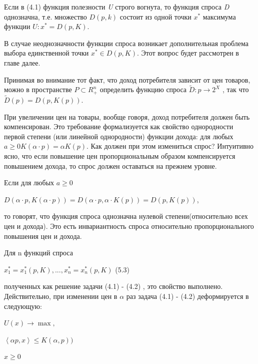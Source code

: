 \documentclass[12pt, 4paper]{book}
\begin{document}
{Если в (4.1) функция полезности \textit{U} строго вогнута, то функция спроса \textit{D} однозначна, т.е. множество $D(p,k)$ состоит из одной точки $x^{*}$ максимума функции $U:x^{*} = D(p,K)$. 
\par

В случае неоднозначности функции спроса возникает дополнительная проблема выбора единственной точки $x^{*} \in D(p,K)$. Этот вопрос будет рассмотрен в главе далее. 
\par

Принимая во внимание тот факт, что доход потребителя зависит от цен товаров, можно в пространстве $P\subset R_{+}^{n} $ определить функцию спроса $\widetilde{D}:p \rightarrow 2^{X}$ , так что $\widetilde{D}(p) = D(p,K(p)) $.
\par

При увеличении цен на товары, вообще говоря, доход потребителя должен быть компенсирован. Это требование формализуется как свойство однородности первой степени (или линейной однородности) функции дохода: для любых $a \geq 0 K(\alpha \cdot p) = \alpha K(p)$. Как должен при этом измениться спрос? Интуитивно ясно, что если повышение цен пропорциональным образом компенсируется повышением дохода, то спрос должен оставаться на прежнем уровне. 
\par

Если для любых $a \geq 0$
\begin{center}
$D(\alpha \cdot p, K(\alpha \cdot p)) = D (\alpha \cdot p, \alpha \cdot K(p)) = D(p,K(p))$,
\end{center}
то говорят, что функция спроса однозначна нулевой степени(относительно всех цен и дохода). Это есть инвариантность спроса относительно пропорционального повышения цен и дохода. 
\par

Для n функций спроса 
\begin{center}
$x_{1}^{*} = x_{1}^{*}(p,K),...,x_{n}^{*}=x_{n}^{*}(p,K)$ (5.3)
\end{center}
полученных как решение задачи (4.1) - (4.2) , это свойство выполнено. Действительно, при изменении цен в $\alpha$ раз задача (4.1) - (4.2) деформируется в следующую: 
\begin{center}
$U(x)\rightarrow \max,$
\end{center}
\begin{center}
$\left\langle \alpha p ,x \right\rangle \leq K(\alpha , p))$
\end{center}
\begin{center}
$x \geq 0$
\end{center}
\par

}
\end{document}

